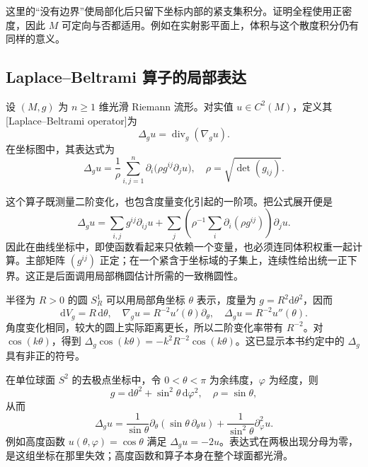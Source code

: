 这里的“没有边界”使局部化后只留下坐标内部的紧支集积分。证明全程使用正密度，因此 \(M\) 可定向与否都适用。例如在实射影平面上，体积与这个散度积分仍有同样的意义。

\subsection{Laplace–Beltrami 算子的局部表达}
\label{b2:subsec:260202}

\begin{definition}
\label{b2:def:26-laplace-beltrami}
设 \((M,g)\) 为 \(n\geq1\) 维光滑 Riemann 流形。对实值 \(u\in C^2(M)\)，定义其 [Laplace--Beltrami operator]为
\[
 \Delta_g u=\operatorname{div}_g(\nabla_g u).
\]
在坐标图中，其表达式为
\begin{equation}
\label{b2:eq:26-laplace-beltrami-coordinate}
 \Delta_g u
 =\frac1\rho\sum_{i,j=1}^n
   \partial_i\bigl(\rho g^{ij}\partial_j u\bigr),
 \quad \rho=\sqrt{\det(g_{ij})}.
\end{equation}
\end{definition}

这个算子既测量二阶变化，也包含度量变化引起的一阶项。把公式展开便是
\[
 \Delta_g u
 =\sum_{i,j}g^{ij}\partial_{ij}u
  +\sum_j\left(\rho^{-1}\sum_i\partial_i(\rho g^{ij})\right)
      \partial_j u.
\]
因此在曲线坐标中，即使函数看起来只依赖一个变量，也必须连同体积权重一起计算。主部矩阵 \((g^{ij})\) 正定；在一个紧含于坐标域的子集上，连续性给出统一正下界。这正是后面调用局部椭圆估计所需的一致椭圆性。

半径为 \(R>0\) 的圆 \(S_R^1\) 可以用局部角坐标 \(\theta\) 表示，度量为 \(g=R^2\mathrm d\theta^2\)，因而
\[
 \mathrm dV_g=R\,\mathrm d\theta,
 \quad \nabla_g u=R^{-2}u'(\theta)\partial_\theta,
 \quad \Delta_g u=R^{-2}u''(\theta).
\]
角度变化相同，较大的圆上实际距离更长，所以二阶变化率带有 \(R^{-2}\)。对 \(\cos(k\theta)\)，得到
\(\Delta_g\cos(k\theta)=-k^2R^{-2}\cos(k\theta)\)。这已显示本书约定中的 \(\Delta_g\) 具有非正的符号。

在单位球面 \(S^2\) 的去极点坐标中，令 \(0<\theta<\pi\) 为余纬度，\(\varphi\) 为经度，则
\[
 g=\mathrm d\theta^2+\sin^2\theta\,\mathrm d\varphi^2,
 \quad \rho=\sin\theta,
\]
从而
\[
 \Delta_g u
 =\frac1{\sin\theta}\partial_\theta
      (\sin\theta\,\partial_\theta u)
    +\frac1{\sin^2\theta}\partial_\varphi^2u.
\]
例如高度函数 \(u(\theta,\varphi)=\cos\theta\) 满足 \(\Delta_g u=-2u\)。表达式在两极出现分母为零，是这组坐标在那里失效；高度函数和算子本身在整个球面都光滑。

